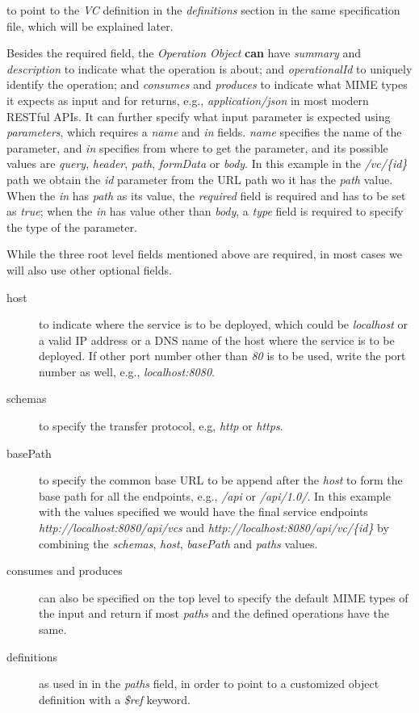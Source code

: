 to point to the \emph{VC} definition in the \emph{definitions} section
in the same specification file, which will be explained later.

Besides the required field, the \emph{Operation Object} \textbf{can}
have \emph{summary} and \emph{description} to indicate what the
operation is about; and \emph{operationalId} to uniquely identify the
operation; and \emph{consumes} and \emph{produces} to indicate what MIME
types it expects as input and for returns, e.g., \emph{application/json}
in most modern RESTful APIs. It can further specify what input parameter
is expected using \emph{parameters}, which requires a \emph{name} and
\emph{in} fields. \emph{name} specifies the name of the parameter, and
\emph{in} specifies from where to get the parameter, and its possible
values are \emph{query}, \emph{header}, \emph{path}, \emph{formData} or
\emph{body}. In this example in the \emph{/vc/\{id\}} path we obtain the
\emph{id} parameter from the URL path wo it has the \emph{path} value.
When the \emph{in} has \emph{path} as its value, the \emph{required}
field is required and has to be set as \emph{true}; when the \emph{in}
has value other than \emph{body}, a \emph{type} field is required to
specify the type of the parameter.

While the three root level fields mentioned above are required, in most
cases we will also use other optional fields. 

\begin{description}
\item[host] to indicate where the service is to be deployed, which
  could be \emph{localhost} or a valid IP address or a DNS name of the
  host where the service is to be deployed. If other port number other
  than \emph{80} is to be used, write the port number as well, e.g.,
  \emph{localhost:8080}.

\item[schemas]
to specify the transfer protocol, e.g, \emph{http} or \emph{https}. 
\item[basePath] to specify the common base URL to be append after the
\emph{host} to form the base path for all the endpoints, e.g.,
\emph{/api} or \emph{/api/1.0/}. In this example with the values
specified we would have the final service endpoints
\emph{http://localhost:8080/api/vcs} and
\emph{http://localhost:8080/api/vc/\{id\}} by combining the
\emph{schemas}, \emph{host}, \emph{basePath} and \emph{paths} values. 

\item[consumes and produces] can also be specified on the top
level to specify the default MIME types of the input and return if most
\emph{paths} and the defined operations have the same.

\item[definitions] as used in in the
\emph{paths} field, in order to point to a customized object definition
with a \emph{\$ref} keyword.

\end{description}


